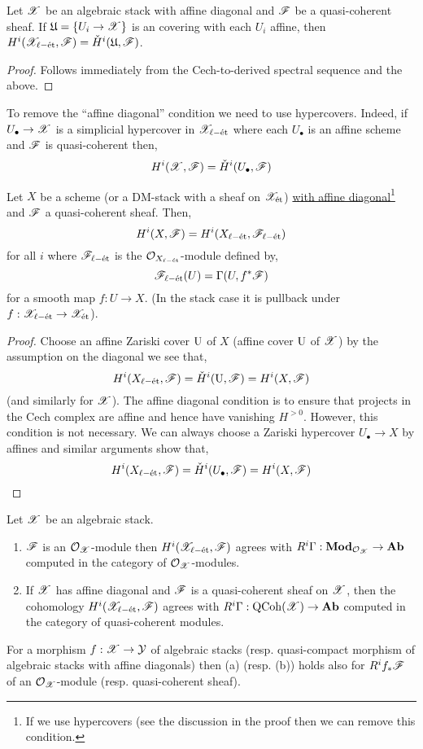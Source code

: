 \documentclass[12pt]{article}
\begin{document}
\begin{prop}
Let $\mathscr{X}$ be an algebraic stack with affine diagonal and $\mathscr{F}$ be a quasi-coherent sheaf. If $\mathfrak{U} = \{U_i \to \mathscr{X} \}$ is an \etale covering with each $U_i$ affine, then $H^i(\mathscr{X}_{\ell-\text{\'{e}t}}, \mathscr{F}) = \check{H}^i(\mathfrak{U}, \mathscr{F})$. 
\end{prop}

\begin{proof}
Follows immediately from the Cech-to-derived spectral sequence and the above. 
\end{proof}

\begin{rmk}
To remove the ``affine diagonal'' condition we need to use hypercovers. Indeed, if $U_\bullet \to \mathscr{X}$ is a simplicial hypercover in $\mathscr{X}_{\ell-\text{\'{e}t}}$ where each $U_\bullet$ is an affine scheme and $\mathscr{F}$ is quasi-coherent then,
\[ H^i(\mathscr{X}, \mathscr{F}) = \check{H}^i(U_\bullet, \mathscr{F}) \]
\end{rmk}

\begin{prop}
Let $X$ be a scheme (or a DM-stack with a sheaf on $\mathscr{X}_{\text{\'{e}t}}$) \ul{with affine diagonal}\footnote{If we use hypercovers (see the discussion in the proof then we can remove this condition.} and $\mathscr{F}$ a quasi-coherent sheaf. Then,
\[ H^i(X, \mathscr{F}) = H^i(X_{\ell-\text{\'{e}t}}, \mathscr{F}_{\ell-\text{\'{e}t}}) \]
for all $i$ where $\mathscr{F}_{\ell-\text{\'{e}t}}$ is the $\mathcal{O}_{X_{\ell-\text{\'{e}t}}}$-module defined by,
\[ \mathscr{F}_{\ell-\text{\'{e}t}}(U) = \Gamma(U, f^* \mathscr{F}) \]
for a smooth map $f : U \to X$. (In the stack case it is pullback under $f : \mathscr{X}_{\ell-\text{\'{e}t}} \to \mathscr{X}_{\text{\'{e}t}}$).
\end{prop}

\begin{proof}
Choose an affine Zariski cover $\mathrm{U}$ of $X$ (affine \etale cover $\mathrm{U}$ of $\mathscr{X}$) by the assumption on the diagonal we see that,
\[ H^i(X_{\ell-\text{\'{e}t}}, \mathscr{F}) = \check{H}^i(\mathrm{U}, \mathscr{F}) = H^i(X, \mathscr{F}) \]
(and similarly for $\mathscr{X}$). The affine diagonal condition is to ensure that projects in the Cech complex are affine and hence have vanishing $H^{>0}$. However, this condition is not necessary. We can always choose a Zariski hypercover $U_\bullet \to X$ by affines and similar arguments show that,
\[ H^i(X_{\ell-\text{\'{e}t}}, \mathscr{F}) = \check{H}^i(U_\bullet, \mathscr{F}) = H^i(X, \mathscr{F}) \]
\end{proof}

\begin{prop}
Let $\mathscr{X}$ be an algebraic stack.
\begin{enumerate}
\item $\mathscr{F}$ is an $\mathcal{O}_{\mathscr{X}}$-module then $H^i(\mathscr{X}_{\ell-\text{\'{e}t}}, \mathscr{F})$ agrees with $R^i \Gamma : \mathbf{Mod}_{\mathcal{O}_{\mathscr{X}}} \to \mathbf{Ab}$ computed in the category of $\mathcal{O}_{\mathscr{X}}$-modules.
\item If $\mathscr{X}$ has affine diagonal and $\mathscr{F}$ is a quasi-coherent sheaf on $\mathscr{X}$, then the cohomology $H^i(\mathscr{X}_{\ell-\text{\'{e}t}}, \mathscr{F})$ agrees with $R^i \Gamma : \mathrm{QCoh}{(\mathscr{X})} \to \mathbf{Ab}$ computed in the category of quasi-coherent modules.
\end{enumerate}
For a morphism $f : \mathscr{X} \to \mathcal{Y}$ of algebraic stacks (resp. quasi-compact morphism of algebraic stacks with affine diagonals) then (a) (resp. (b)) holds also for $R^i f_* \mathscr{F}$ of an $\mathcal{O}_{\mathscr{X}}$-module (resp. quasi-coherent sheaf).
\end{prop}
\end{document}
